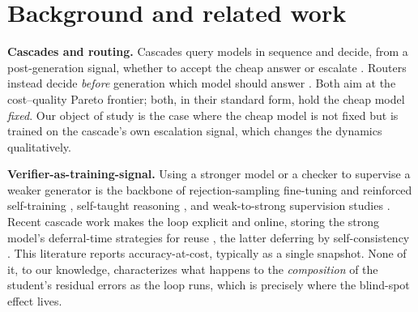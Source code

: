 \documentclass[11pt]{article}
\begin{document}
\section{Background and related work}

\textbf{Cascades and routing.} Cascades query models in sequence and
decide, from a post-generation signal, whether to accept the cheap
answer or escalate
\cite{chen2023frugalgpt,dohan2022cascades,aggarwal2023automix}.
Routers instead decide \emph{before} generation which model should
answer \cite{ong2024routellm}. Both aim at the cost--quality Pareto
frontier; both, in their standard form, hold the cheap model
\emph{fixed}. Our object of study is the case where the cheap model is
not fixed but is trained on the cascade's own escalation signal, which
changes the dynamics qualitatively.

\textbf{Verifier-as-training-signal.} Using a stronger model or a
checker to supervise a weaker generator is the backbone of
rejection-sampling fine-tuning and reinforced self-training
\cite{gulcehre2023rest}, self-taught reasoning \cite{zelikman2022star},
and weak-to-strong supervision studies \cite{burns2023weaktostrong}.
Recent cascade work makes the loop explicit and online, storing the
strong model's deferral-time strategies for reuse
\cite{intercascade2025,sarukkai2025deferral}, the latter deferring
by self-consistency \cite{wang2022selfconsistency}. This literature
reports accuracy-at-cost, typically as a single snapshot. None of it, to
our knowledge, characterizes what happens to the \emph{composition} of
the student's residual errors as the loop runs, which is precisely where
the blind-spot effect lives.
\end{document}
